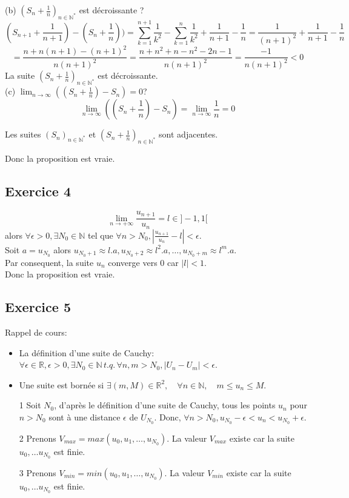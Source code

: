 \documentclass[]{book}
\theoremstyle{definition}
\newcommand{\bb}[1]{\mathbb{#1}}
\newcommand{\R}{\bb{R}}
\newcommand{\N}{\bb{N}}
\begin{document}
(b) $(S_n+\frac{1}{n})_{n \in \N^{*}}$ est d\'ecroissante ?\\
$$(S_{n+1} +\frac{1}{n+1}) - (S_{n}+\frac{1}{n})) = \sum_{k=1}^{n+1}\frac{1}{k^2} - \sum_{k=1}^{n}\frac{1}{k^2} + \frac{1}{n+1} - \frac{1}{n} = \frac{1}{(n+1)^2} + \frac{1}{n+1} - \frac{1}{n}$$  
$$= \frac{n+n(n+1)-(n+1)^2}{n(n+1)^2} = \frac{n+n^2+n-n^2-2n-1}{n(n+1)^2} = \frac{-1}{n(n+1)^2} < 0$$
La suite $(S_n+\frac{1}{n})_{n \in \N^{*}}$ est d\'ecroissante.\\

(c) $\lim_{n \to \infty}((S_n + \frac{1}{n}) - S_n) = 0 $?
$$\lim_{n \to \infty}((S_n + \frac{1}{n}) - S_n) = \lim_{n \to \infty}\frac{1}{n} = 0 $$


Les suites $(S_n)_{n \in \N^{*}}$ et $(S_n+\frac{1}{n})_{n \in \N^{*}}$ sont adjacentes.

Donc la proposition est vraie.


\subsection*{Exercice 4}
$$\lim_{n \to +\infty} \frac{u_{n+1}}{u_{n}} = l \in ]-1,1[$$ 
alors $\forall \epsilon > 0, \exists N_0 \in \mathbb{N}$ tel que $\forall n > N_{0}, |\frac{u_{n+1}}{u_{n}} - l| < \epsilon$. \\
Soit $a = u_{N_0}$ alors $u_{N_0+1} \approx l.a, u_{N_0+2} \approx {l^2.a}, \ldots , u_{N_0+m} \approx {l^{m}.a}$. \\
Par consequent, la suite $u_n$ converge vers $0$ car $|l| < 1$.
\\ 
Donc la proposition est vraie.


\subsection*{Exercice 5}
Rappel de cours:
\begin{itemize}
\item La d\'efinition d'une suite de Cauchy: $ \forall \epsilon \in \R, \epsilon> 0, \exists N_0 \in \N \, t.q.\,\forall n, m > N_0, |U_n - U_m| < \epsilon$.
\item Une suite est born\'ee si $\exists (m,M)\in \R^{2},\quad \forall n\in \N, \quad m\leq u_{n}\leq M$.\\
\end{itemize}

\begin{itemize}
\item [1] Soit $N_0$, d'apr\`es le d\'efinition d'une suite de Cauchy, tous les points $u_n$ pour $n>N_0$ sont \`a une distance $\epsilon$ de $U_{N_0}$. Donc, $\forall n > N_0, u_{N_0}-\epsilon < u_n < u_{N_0}+\epsilon$. 
\item [2] Prenons $V_{max} = max(u_0, u_1, \ldots, u_{N_0})$. La valeur $V_{max}$ existe car la suite $u_0, \ldots u_{N_0}$ est finie. \\
\item [3] Prenons $V_{min} = min(u_0, u_1, \ldots, u_{N_0})$. La valeur $V_{min}$ existe car la suite $u_0, \ldots u_{N_0}$ est finie.\\
\end{itemize}
\end{document}
